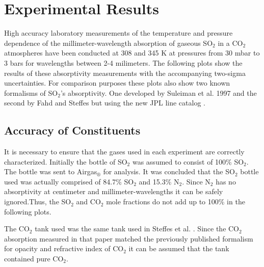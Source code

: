 \clearpage
\section{Experimental Results}
High accuracy laboratory measurements of the temperature and pressure dependence of the millimeter-wavelength absorption of gaseous SO$_2$ in a CO$_2$ atmospheres have been conducted at 308 and 345 K at pressures from 30 mbar to 3 bars for wavelengths between 2-4 milimeters. The following plots show the results of these absorptivity measurements with the accompanying two-sigma uncertainties. For comparison purposes these plots also show two known formalisms of SO$_2$'s absorptivity. One developed by Suleiman et al. 1997 \cite{Suleiman-thesis} and the second by Fahd and Steffes \cite{Fahd-thesis} but using the new JPL line catalog \cite{Pickett-1998}. 

\subsection{Accuracy of Constituents}

It is necessary to ensure that the gases used in each experiment are correctly characterized. Initially the bottle of SO$_2$ was assumed to consist of 100\% SO$_2$. The bottle was sent to Airgas$_\circledR$ for analysis. It was concluded that the SO$_2$ bottle used was actually comprised of 84.7\% SO$_2$ and 15.3\% N$_2$. Since N$_2$ has no absorptivity at centimeter and millimeter-wavelengths it can be safely ignored.Thus, the SO$_2$  and CO$_2$ mole fractions do not add up to 100\% in the following plots. 




The CO$_2$ tank used was the same tank used in Steffes et al. \cite{Steffes-2014}. Since the CO$_2$ absorption measured in that paper matched the previously published formalism for opacity and refractive index of CO$_2$ \cite{Ho-1966} it can be assumed that the tank contained pure CO$_2$.

